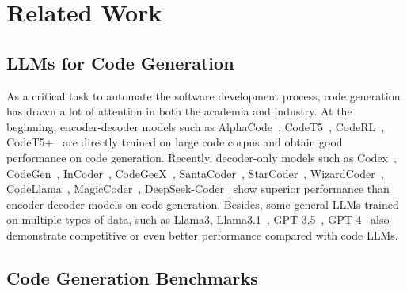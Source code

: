 \section{Related Work}\label{sec:literature}

\subsection{LLMs for Code Generation}
As a critical task to automate the software development process, code generation has drawn a lot of attention in both the academia and industry. At the beginning, encoder-decoder models such as AlphaCode~\cite{codecontests}, CodeT5~\cite{codet5}, CodeRL~\cite{coderl}, CodeT5+~\cite{codet5plus} are directly trained on large code corpus and obtain good performance on code generation. Recently, decoder-only models such as Codex~\cite{codex}, CodeGen~\cite{codegen, codegen2}, InCoder~\cite{incoder}, CodeGeeX~\cite{humanevalx}, SantaCoder~\cite{santacoder}, StarCoder~\cite{starcoder,starcoder2}, WizardCoder~\cite{wizardcoder}, CodeLlama~\cite{codellama}, MagicCoder~\cite{magiccoder}, DeepSeek-Coder~\cite{deepseekcoder} show superior performance than encoder-decoder models on code generation. Besides, some general LLMs trained on multiple types of data, such as Llama3\cite{llama3}, Llama3.1~\cite{llama31}, GPT-3.5~\cite{chatgpt}, GPT-4~\cite{gpt4} also demonstrate competitive or even better performance compared with code LLMs.



\subsection{Code Generation Benchmarks}

